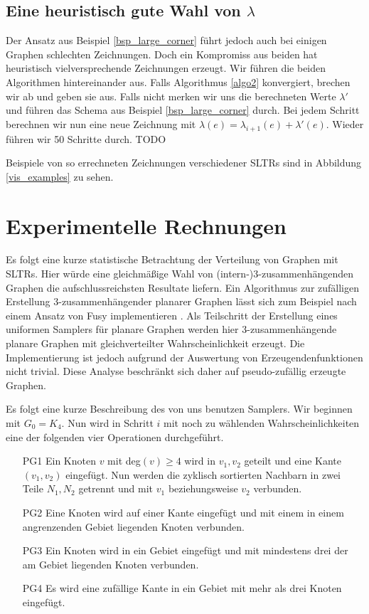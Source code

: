 \subsection{Eine heuristisch gute Wahl von $\lambda$}

Der Ansatz aus Beispiel \ref{bsp_large_corner} führt jedoch auch bei einigen Graphen schlechten Zeichnungen. Doch ein Kompromiss aus beiden hat heuristisch vielversprechende Zeichnungen erzeugt. Wir führen die beiden Algorithmen hintereinander aus. Falls Algorithmus \ref{algo2} konvergiert, brechen wir ab und geben sie aus. Falls nicht merken wir uns die berechneten Werte $\lambda'$ und führen das Schema aus Beispiel \ref{bsp_large_corner} durch. Bei jedem Schritt berechnen wir nun eine neue Zeichnung mit $\lambda(e) = \lambda_{i+1}(e) + \lambda'(e)$. Wieder führen wir 50 Schritte durch.  TODO

Beispiele von so errechneten Zeichnungen verschiedener SLTRs sind in Abbildung \ref{vis_examples} zu sehen.

\section{Experimentelle Rechnungen}\label{stats}

Es folgt eine kurze statistische Betrachtung der Verteilung von Graphen mit SLTRs. Hier würde eine gleichmäßige Wahl von (intern-)3-zusammenhängenden Graphen die aufschlussreichsten Resultate liefern. Ein Algorithmus zur zufälligen Erstellung 3-zusammenhängender planarer Graphen lässt sich zum Beispiel nach einem Ansatz von Fusy implementieren \cite{fusy09}. Als Teilschritt der Erstellung eines uniformen Samplers für planare Graphen werden hier 3-zusammenhängende planare Graphen mit gleichverteilter Wahrscheinlichkeit erzeugt. Die Implementierung ist jedoch aufgrund der Auswertung von Erzeugendenfunktionen nicht trivial. Diese Analyse beschränkt sich daher auf pseudo-zufällig erzeugte Graphen. 

Es folgt eine kurze Beschreibung des von uns benutzen Samplers. Wir beginnen mit $G_0 = K_4$. Nun wird in Schritt $i$ mit noch zu wählenden Wahrscheinlichkeiten eine der folgenden vier Operationen durchgeführt.

\begin{itemize}
\item[PG1] Ein Knoten $v$ mit deg$(v) \geq 4$ wird in $v_1,v_2$ geteilt und eine Kante $(v_1,v_2)$ eingefügt. Nun werden die zyklisch sortierten Nachbarn in zwei Teile $N_1,N_2$ getrennt und mit $v_1$ beziehungsweise $v_2$ verbunden.
\item[PG2] Eine Knoten wird auf einer Kante eingefügt und mit einem in einem angrenzenden Gebiet liegenden Knoten verbunden.
\item[PG3] Ein Knoten wird in ein Gebiet eingefügt und mit mindestens drei der am Gebiet liegenden Knoten verbunden. 
\item[PG4] Es wird eine zufällige Kante in ein Gebiet mit mehr als drei Knoten eingefügt.
\end{itemize}

